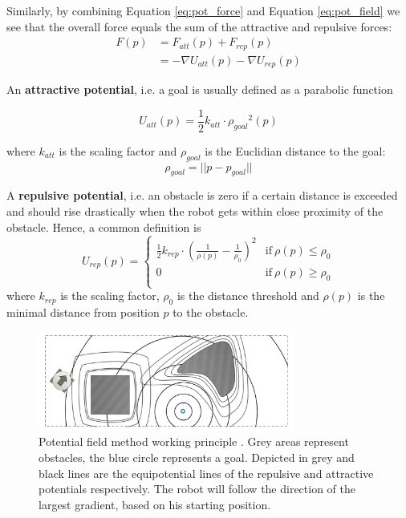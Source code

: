 Similarly, by combining Equation \ref{eq:pot_force} and Equation \ref{eq:pot_field} we see that the overall force equals the sum of the attractive and repulsive forces:
\begin{equation}
\begin{aligned}
F(p) &= F_{att}(p) + F_{rep}(p) \\
&= -\nabla U_{att}(p)-\nabla U_{rep}(p)
\end{aligned}
\end{equation}


An \textbf{attractive potential}, i.e. a goal is usually defined as a parabolic function

\begin{equation}
U_{att}(p) = \frac{1}{2} k_{att} \cdot {\rho_{goal}}^2(p)
\end{equation}

where $k_{att}$ is the scaling factor and $\rho_{goal}$ is the Euclidian distance to the goal:
\begin{equation}
\rho_{goal} = ||p-p_{goal}||
\end{equation}


A \textbf{repulsive potential}, i.e. an obstacle is zero if a certain distance is exceeded and should rise drastically when the robot gets within close proximity of the obstacle. Hence, a common definition is
\begin{equation}
U_{rep}(p) = \begin{cases}
      \frac{1}{2} k_{rep}\cdot (\frac{1}{\rho (p)}-\frac{1}{\rho_0})^2 & \text{if}\ \rho (p) \leq \rho_0 \\
      0 & \text{if}\ \rho (p) \geq \rho_0 \\
    \end{cases}
    \label{eq:pot_field_repulsive}
\end{equation}
where $k_{rep}$ is the scaling factor, $\rho_0$ is the distance threshold and $\rho (p)$ is the minimal distance from position $p$ to the obstacle.

\begin{figure}[h]
   \centering
   \includegraphics[width=0.75\textwidth]{images/pot_field.png}
   \caption{Potential field method working principle \citep{siegwart2004autonomous}. Grey areas represent obstacles, the blue circle represents a goal. Depicted in grey and black lines are the equipotential lines of the repulsive and attractive potentials respectively. The robot will follow the direction of the largest gradient, based on his starting position.} 
   \label{pics:pot_field}
\end{figure}

